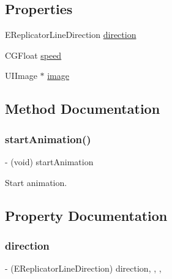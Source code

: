 \subsection*{Properties}
\begin{DoxyCompactItemize}
\item 
E\+Replicator\+Line\+Direction \mbox{\hyperlink{interface_replicator_line_animation_view_a7d9b967a9062457d0cf0db2e3bd947f2}{direction}}
\item 
C\+G\+Float \mbox{\hyperlink{interface_replicator_line_animation_view_a787ffd86f0328cae0b9ffbf0e30fc838}{speed}}
\item 
U\+I\+Image $\ast$ \mbox{\hyperlink{interface_replicator_line_animation_view_a45735c98c22446a360c62b7ce8fefad0}{image}}
\end{DoxyCompactItemize}


\subsection{Method Documentation}
\mbox{\label{interface_replicator_line_animation_view_a2eee6cbda6826b2d93d448d06fcd5353}} 
\subsubsection{\texorpdfstring{start\+Animation()}{startAnimation()}}
{\footnotesize\ttfamily -\/ (void) start\+Animation \begin{DoxyParamCaption}{ }\end{DoxyParamCaption}}

Start animation. 

\subsection{Property Documentation}
\mbox{\label{interface_replicator_line_animation_view_a7d9b967a9062457d0cf0db2e3bd947f2}} 
\subsubsection{\texorpdfstring{direction}{direction}}
{\footnotesize\ttfamily -\/ (E\+Replicator\+Line\+Direction) direction\hspace{0.3cm}{\ttfamily [read]}, {\ttfamily [write]}, {\ttfamily [nonatomic]}, {\ttfamily [assign]}}

